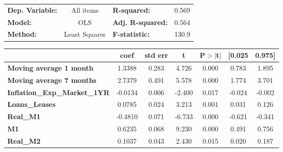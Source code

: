 \documentclass[12pt]{article}
\begin{document}
\begin{adjustwidth}{-2cm}{}
\begin{table}
\begin{tabular}{lclc}
\toprule
\textbf{Dep. Variable:}                                                  &    All items     & \textbf{  R-squared:         } &     0.569   \\
\textbf{Model:}                                                          &       OLS        & \textbf{  Adj. R-squared:    } &     0.564   \\
\textbf{Method:}                                                         &  Least Squares   & \textbf{  F-statistic:       } &     130.9   \\

\bottomrule
\end{tabular}
\begin{tabular}{lcccccc}
                                                                         & \textbf{coef} & \textbf{std err} & \textbf{t} & \textbf{P$> |$t$|$} & \textbf{[0.025} & \textbf{0.975]}  \\
\midrule
\textbf{Moving average 1 month}                                                               &       1.3388  &        0.283     &     4.726  &         0.000        &        0.783    &        1.895     \\
\textbf{Moving average 7 months}                                                               &       2.7379  &        0.491     &     5.578  &         0.000        &        1.774    &        3.701     \\
\textbf{Inflation\_Exp\_Market\_1YR} &      -0.0134  &        0.006     &    -2.400  &         0.017        &       -0.024    &       -0.002     \\
\textbf{Loans\_Leases}                                     &       0.0785  &        0.024     &     3.213  &         0.001        &        0.031    &        0.126     \\
\textbf{Real\_M1}                                          &      -0.4810  &        0.071     &    -6.733  &         0.000        &       -0.621    &       -0.341     \\
\textbf{M1}                                                &       0.6235  &        0.068     &     9.230  &         0.000        &        0.491    &        0.756     \\
\textbf{Real\_M2}                                          &       0.1037  &        0.043     &     2.430  &         0.015        &        0.020    &        0.187     \\

\end{tabular}
\end{table}
\end{adjustwidth}
\end{document}
